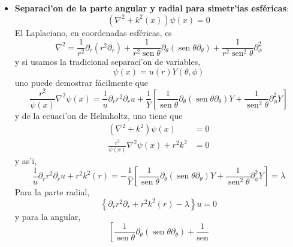 \begin{itemize}
\item \textbf{Separaci'on de la parte angular y radial para simetr'ias
esf\'{e}ricas}:
\begin{equation}
\left(  \nabla^{2}+k^{2}\left(  x\right)  \right)  \psi\left(  x\right)  =0
\end{equation}
El Laplaciano, en coordenadas esf\'{e}ricas, es
\begin{equation}
\nabla^{2}=\frac{1}{r^{2}}\partial_{r}\left(  r^{2}\partial_{r}\right)
+\frac{1}{r^{2}\operatorname{sen}\theta}\partial_{\theta}\left(
\operatorname{sen}\theta\partial_{\theta}\right)  +\frac{1}{r^{2}%
\operatorname{sen}^{2}\theta}\partial_{\phi}^{2}%
\end{equation}
y si usamos la tradicional separaci'on de variables,
\begin{equation}
\psi\left(  x\right)  =u\left(  r\right)  Y\left(  \theta,\phi\right)
\end{equation}
uno puede demostrar f\'{a}cilmente que
\begin{equation}
\frac{r^{2}}{\psi\left(  x\right)  }\nabla^{2}\psi\left(  x\right)  =\frac
{1}{u}\partial_{r}r^{2}\partial_{r}u+\frac{1}{Y}\left[  \frac{1}%
{\operatorname{sen}\theta}\partial_{\theta}\left(  \operatorname{sen}%
\theta\partial_{\theta}\right)  Y+\frac{1}{\operatorname{sen}^{2}\theta
}\partial_{\phi}^{2}Y\right]
\end{equation}
y de la ecuaci'on de Helmholtz, uno tiene que
\begin{align*}
\left(  \nabla^{2}+k^{2}\right)  \psi\left(  x\right)   & =0\\
\frac{r^{2}}{\psi\left(  x\right)  }\nabla^{2}\psi\left(  x\right)
+r^{2}k^{2}  & =0
\end{align*}
y as'i,
\begin{equation}
\frac{1}{u}\partial_{r}r^{2}\partial_{r}u+r^{2}k^{2}\left(  r\right)
=-\frac{1}{Y}\left[  \frac{1}{\operatorname{sen}\theta}\partial_{\theta
}\left(  \operatorname{sen}\theta\partial_{\theta}\right)  Y+\frac
{1}{\operatorname{sen}^{2}\theta}\partial_{\phi}^{2}Y\right]  =\lambda
\end{equation}
Para la parte radial,
\begin{equation}
\left\{  \partial_{r}r^{2}\partial_{r}+r^{2}k^{2}\left(  r\right)
-\lambda\right\}  u=0
\end{equation}
y para la angular,
\begin{equation}
\left[  \frac{1}{\operatorname{sen}\theta}\partial_{\theta}\left(
\operatorname{sen}\theta\partial_{\theta}\right)  +\frac{1}{\operatorname{sen}%
}
\end{equation}
\end{itemize}
